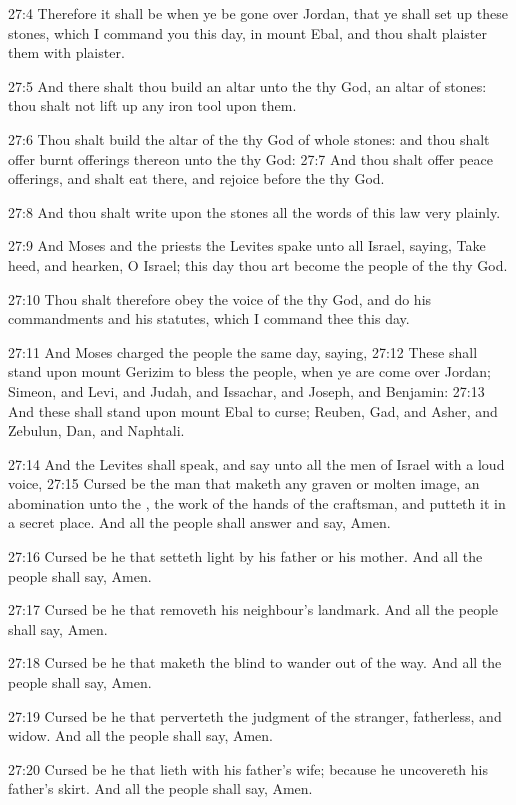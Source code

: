 27:4 Therefore it shall be when ye be gone over Jordan, that ye shall
set up these stones, which I command you this day, in mount Ebal, and
thou shalt plaister them with plaister.

27:5 And there shalt thou build an altar unto the \LORD thy God, an
altar of stones: thou shalt not lift up any iron tool upon them.

27:6 Thou shalt build the altar of the \LORD thy God of whole stones:
and thou shalt offer burnt offerings thereon unto the \LORD thy God:
27:7 And thou shalt offer peace offerings, and shalt eat there, and
rejoice before the \LORD thy God.

27:8 And thou shalt write upon the stones all the words of this law
very plainly.

27:9 And Moses and the priests the Levites spake unto all Israel,
saying, Take heed, and hearken, O Israel; this day thou art become the
people of the \LORD thy God.

27:10 Thou shalt therefore obey the voice of the \LORD thy God, and do
his commandments and his statutes, which I command thee this day.

27:11 And Moses charged the people the same day, saying, 27:12 These
shall stand upon mount Gerizim to bless the people, when ye are come
over Jordan; Simeon, and Levi, and Judah, and Issachar, and Joseph,
and Benjamin: 27:13 And these shall stand upon mount Ebal to curse;
Reuben, Gad, and Asher, and Zebulun, Dan, and Naphtali.

27:14 And the Levites shall speak, and say unto all the men of Israel
with a loud voice, 27:15 Cursed be the man that maketh any graven or
molten image, an abomination unto the \LORD, the work of the hands of
the craftsman, and putteth it in a secret place. And all the people
shall answer and say, Amen.

27:16 Cursed be he that setteth light by his father or his mother. And
all the people shall say, Amen.

27:17 Cursed be he that removeth his neighbour's landmark. And all the
people shall say, Amen.

27:18 Cursed be he that maketh the blind to wander out of the way. And
all the people shall say, Amen.

27:19 Cursed be he that perverteth the judgment of the stranger,
fatherless, and widow. And all the people shall say, Amen.

27:20 Cursed be he that lieth with his father's wife; because he
uncovereth his father's skirt. And all the people shall say, Amen.


